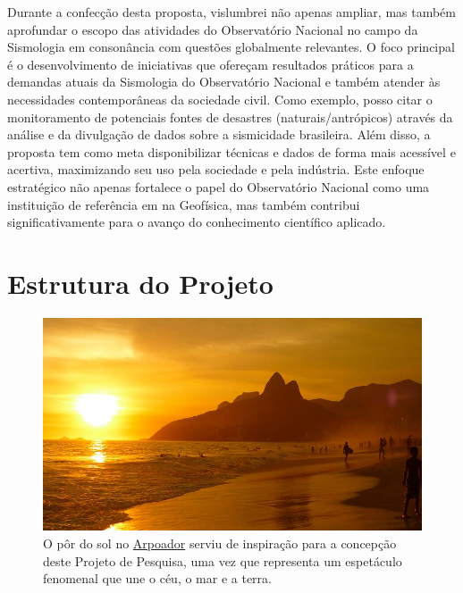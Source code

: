 \documentclass[10pt,a4paper,oneside]{book}
\newcommand{\HeroFigPad}{\vspace{-1cm}}
\begin{document}
\bigskip	

Durante a confecção desta proposta, vislumbrei não apenas ampliar, mas também aprofundar o escopo das atividades do Observatório Nacional no campo da Sismologia em consonância com questões globalmente relevantes. O foco principal é o desenvolvimento de iniciativas que ofereçam resultados práticos para a demandas atuais da Sismologia do Observatório Nacional e também atender às necessidades contemporâneas da sociedade civil. Como exemplo, posso citar o monitoramento de potenciais fontes de desastres (naturais/antrópicos) através da análise e da divulgação de dados sobre a sismicidade brasileira. Além disso, a proposta tem como meta disponibilizar técnicas e dados de forma mais acessível e acertiva, maximizando seu uso pela sociedade e pela indústria. Este enfoque estratégico não apenas fortalece o papel do Observatório Nacional como uma instituição de referência em na Geofísica, mas também contribui significativamente para o avanço do conhecimento científico aplicado.


\chapter{Estrutura do Projeto}
\label{cap_estrutura}

\begin{figure}[h]
	\HeroFigPad
	\begin{center}
		\includegraphics[width=\textwidth]{images/arpoador.jpg}
	\end{center}
	\caption{
	O pôr do sol no \href{https://pt.wikipedia.org/wiki/Arpoador}{Arpoador} serviu de inspiração para a concepção deste Projeto de Pesquisa, uma vez que representa um espetáculo fenomenal que une o céu, o mar e a terra.
    }
 \label{fig_arpoador}
\end{figure}
\end{document}
